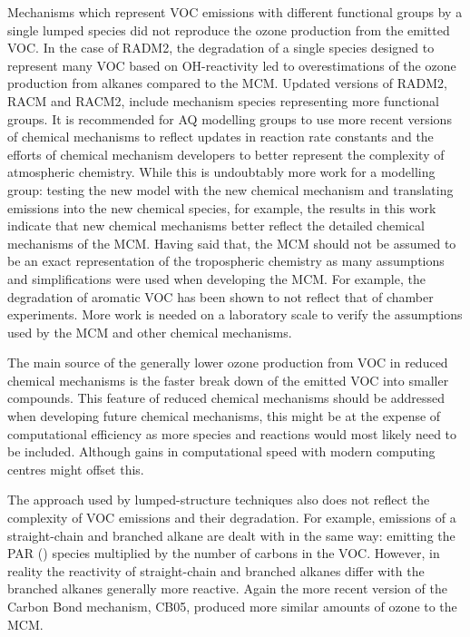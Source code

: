 Mechanisms which represent VOC emissions with different functional groups by a single lumped species did not reproduce the ozone production from the emitted VOC.
In the case of RADM2, the degradation of a single species designed to represent many VOC based on OH-reactivity led to overestimations of the ozone production from alkanes compared to the MCM.
Updated versions of RADM2, RACM and RACM2, include mechanism species representing more functional groups. 
It is recommended for AQ modelling groups to use more recent versions of chemical mechanisms to reflect updates in reaction rate constants and the efforts of chemical mechanism developers to better represent the complexity of atmospheric chemistry.
While this is undoubtably more work for a modelling group: testing the new model with the new chemical mechanism and translating emissions into the new chemical species, for example, the results in this work indicate that new chemical mechanisms better reflect the detailed chemical mechanisms of the MCM.
Having said that, the MCM should not be assumed to be an exact representation of the tropospheric chemistry as many assumptions and simplifications were used when developing the MCM.
For example, the degradation of aromatic VOC has been shown to not reflect that of chamber experiments.
More work is needed on a laboratory scale to verify the assumptions used by the MCM and other chemical mechanisms.

The main source of the generally lower ozone production from VOC in reduced chemical mechanisms is the faster break down of the emitted VOC into smaller compounds.
This feature of reduced chemical mechanisms should be addressed when developing future chemical mechanisms, this might be at the expense of computational efficiency as more species and reactions would most likely need to be included.
Although gains in computational speed with modern computing centres might offset this.

The approach used by lumped-structure techniques also does not reflect the complexity of VOC emissions and their degradation.
For example, emissions of a straight-chain and branched alkane are dealt with in the same way: emitting the PAR () species multiplied by the number of carbons in the VOC.
However, in reality the reactivity of straight-chain and branched alkanes differ with the branched alkanes generally more reactive.
Again the more recent version of the Carbon Bond mechanism, CB05, produced more similar amounts of ozone to the MCM.

